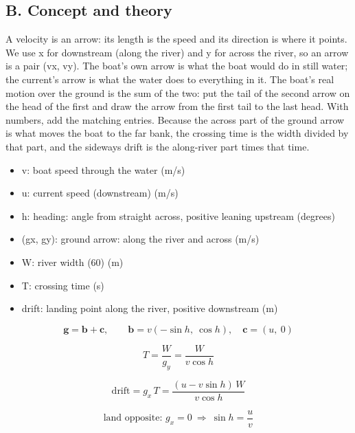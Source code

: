 \documentclass[11pt,a4paper]{article}
\begin{document}
\subsection*{B. Concept and theory}
A velocity is an arrow: its length is the speed and its direction is where it points. We use x for downstream (along the river) and y for across the river, so an arrow is a pair (vx, vy). The boat's own arrow is what the boat would do in still water; the current's arrow is what the water does to everything in it. The boat's real motion over the ground is the sum of the two: put the tail of the second arrow on the head of the first and draw the arrow from the first tail to the last head. With numbers, add the matching entries. Because the across part of the ground arrow is what moves the boat to the far bank, the crossing time is the width divided by that part, and the sideways drift is the along-river part times that time.

\begin{itemize}[nosep]
\item v: boat speed through the water (m/s)
\item u: current speed (downstream) (m/s)
\item h: heading: angle from straight across, positive leaning upstream (degrees)
\item (gx, gy): ground arrow: along the river and across (m/s)
\item W: river width (60) (m)
\item T: crossing time (s)
\item drift: landing point along the river, positive downstream (m)
\end{itemize}

\begin{equation*}
\mathbf g=\mathbf b+\mathbf c,\qquad \mathbf b=v(-\sin h,\ \cos h),\quad \mathbf c=(u,\ 0)
\end{equation*}

\begin{equation*}
T=\frac{W}{g_y}=\frac{W}{v\cos h}
\end{equation*}

\begin{equation*}
\text{drift}=g_x\,T=\frac{(u-v\sin h)\,W}{v\cos h}
\end{equation*}

\begin{equation*}
\text{land opposite: } g_x=0\ \Rightarrow\ \sin h=\frac{u}{v}
\end{equation*}
\end{document}
